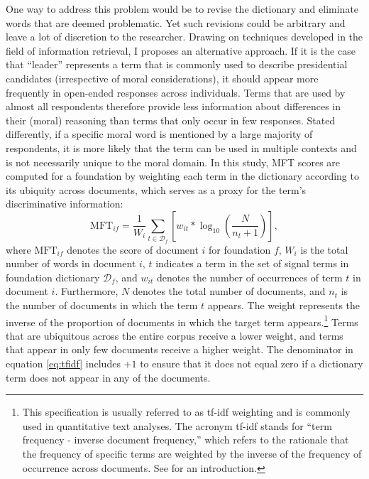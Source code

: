 \documentclass[12pt]{article}
\begin{document}
One way to address this problem would be to revise the dictionary and eliminate words that are deemed problematic. Yet such revisions could be arbitrary and leave a lot of discretion to the researcher. Drawing on techniques developed in the field of information retrieval, I proposes an alternative approach. If it is the case that ``leader'' represents a term that is commonly used to describe presidential candidates (irrespective of moral considerations), it should appear more frequently in open-ended responses across individuals. Terms that are used by almost all respondents therefore provide less information about differences in their (moral) reasoning than terms that only occur in few responses.  Stated differently, if a specific moral word is mentioned by a large majority of respondents, it is more likely that the term can be used in multiple contexts and is not necessarily unique to the moral domain. In this study, MFT scores are computed for a foundation by weighting each term in the dictionary according to its ubiquity across documents, which serves as a proxy for the term's discriminative information:
\begin{equation}\label{eq:tfidf}
\text{MFT}_{if} = \dfrac{1}{W_i} \sum_{t \in \mathcal{D}_f} \left[ w_{it} * \log_{10}\left( \dfrac{N}{n_t+1}\right) \right],
\end{equation}
where $\text{MFT}_{if}$ denotes the score of document $i$ for foundation $f$, $W_i$ is the total number of words in document $i$, $t$ indicates a term in the set of signal terms in foundation dictionary $\mathcal{D}_f$, and $w_{it}$ denotes the number of occurrences of term $t$ in document $i$. Furthermore, $N$ denotes the total number of documents, and $n_t$ is the number of documents in which the term $t$ appears. The weight represents the inverse of the proportion of documents in which the target term appears.\footnote{This specification is usually referred to as tf-idf weighting and is commonly used in quantitative text analyses. The acronym tf-idf stands for ``term frequency - inverse document frequency,'' which refers to the rationale that the frequency of specific terms are weighted by the inverse of the frequency of occurrence across documents. See \citet[ch. 6]{manning2008introduction} for an introduction.} Terms that are ubiquitous across the entire corpus receive a lower weight, and terms that appear in only few documents receive a higher weight. The denominator in equation \eqref{eq:tfidf} includes $+1$ to ensure that it does not equal zero if a dictionary term does not appear in any of the documents.
\end{document}
